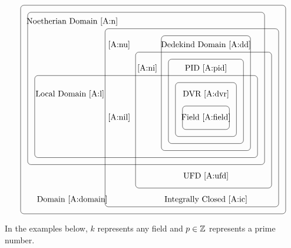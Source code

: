 \documentclass{ximera}
\begin{document}

\[
\begin{tikzpicture}
\draw[rounded corners] (10,10) rectangle (12,11);
\node at (11,10.5) {Field \ref{A:field}};

\node at(7.3,10.5) {\ref{A:nil}};

\draw[rounded corners] (9.7,9.7) rectangle (12.3,12);
\node at (11,11.5) {DVR \ref{A:dvr}};

\draw[rounded corners] (9.4,9.4) rectangle (12.6,13);
\node at (11,12.6) {PID \ref{A:pid}};

\node at (8.5,12.6) {\ref{A:ni}};

\draw[rounded corners] (9.1,9.1) rectangle (12.9,14);
\node at (11,13.6) {Dedekind Domain \ref{A:dd}};

\node at (7.3,13.6) {\ref{A:nu}};

\draw[rounded corners] (8,7.5) rectangle (13.8,13.3); \node at
(11,8) {UFD \ref{A:ufd}};

\draw[rounded corners] (3.7,8.8) rectangle (13.2,12.3);
\node at (5.2,11.5) {Local Domain \ref{A:l}};

\draw[rounded corners] (3.4,8.5) rectangle (13.5,15);
\node at (5.3,14.6) {Noetherian Domain \ref{A:n}};

\draw[rounded corners] (6.7,6.7) rectangle (14.1,14.3);
\node at (11,7) {Integrally Closed \ref{A:ic}};

\draw[rounded corners] (3.1,6.4) rectangle (14.4,15.3);
\node at (5.3,7) {Domain \ref{A:domain}};



\end{tikzpicture}
\]


\noindent In the examples below, $k$ represents any field and $p\in\mathbb Z$
represents a prime number.
\end{document}
